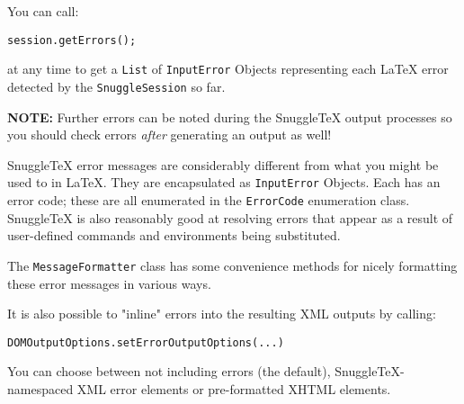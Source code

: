 You can call:
\begin{verbatim}session.getErrors();\end{verbatim}
at any time to get a \verb|List| of \verb|InputError| Objects representing each
LaTeX error detected by the \verb|SnuggleSession| so far.

\textbf{NOTE:} Further errors can be noted during the SnuggleTeX output processes
so you should check errors \emph{after} generating an output as well!

SnuggleTeX error messages are considerably different from what you might be used to in
LaTeX. They are encapsulated as \verb|InputError| Objects. Each has an error
code; these are all enumerated in the \verb|ErrorCode| enumeration class.
SnuggleTeX is also reasonably good at resolving errors that appear as a result
of user-defined commands and environments being substituted.

The \verb|MessageFormatter| class has some convenience methods for nicely formatting
these error messages in various ways.

It is also possible to "inline" errors into the resulting XML outputs by
calling:
\begin{verbatim}DOMOutputOptions.setErrorOutputOptions(...)\end{verbatim}
You can choose between not including errors (the default),
SnuggleTeX-namespaced XML error elements or pre-formatted XHTML elements.
